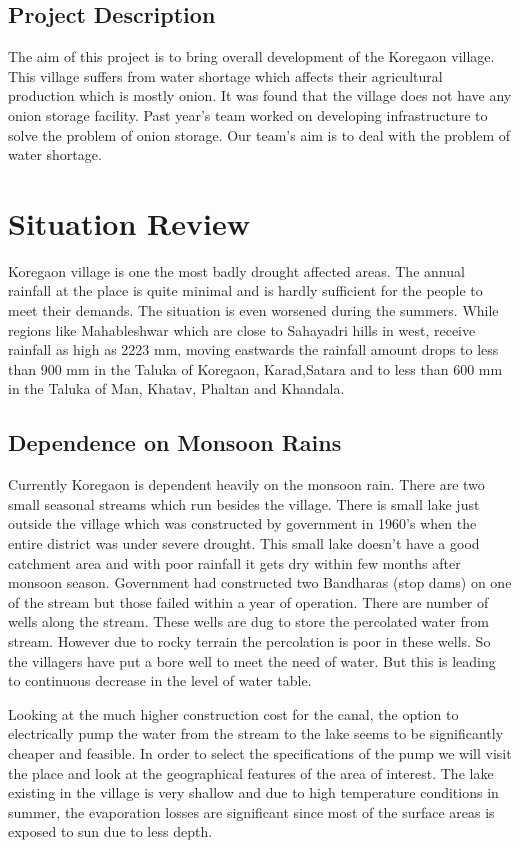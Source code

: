 \documentclass{article}
\begin{document}
\subsection{Project Description}
The aim of this project is to bring overall development of the Koregaon village. This village suffers from
water shortage which affects their agricultural production which is mostly onion. It was found that the
village does not have any onion storage facility. Past year's team worked on developing infrastructure to solve the problem of onion storage. Our team's aim is to deal with the problem of water shortage.
\section{Situation Review}
Koregaon village is one the most badly drought affected areas. The annual rainfall at the place is quite minimal and is hardly sufficient for the people to meet their demands. The situation is even worsened during the summers. While regions like Mahableshwar which are close to Sahayadri hills in west, receive rainfall as high as 2223 mm, moving eastwards the rainfall amount drops to less than 900 mm in the Taluka of Koregaon, Karad,Satara and to less than 600 mm in the Taluka of Man, Khatav, Phaltan and Khandala.
\subsection{Dependence on Monsoon Rains}
Currently Koregaon is dependent heavily on the monsoon rain. There are two small seasonal streams which run besides the village. There is small lake just outside the village which was constructed by government in 1960’s when the entire district was under severe drought. This small lake doesn’t have a good catchment area and with poor rainfall it gets dry within few months after monsoon season. Government had constructed two Bandharas (stop dams) on one of the stream but those failed within a year of operation. There are number of wells along the stream. These wells are dug to store the percolated water from stream. However due to rocky terrain the percolation is poor in these wells. So the villagers have put a bore well to meet the need of water. But this is leading to continuous decrease in the level of water table.

Looking at the much higher construction cost for the canal, the option to electrically pump the water from the stream to the lake seems to be significantly cheaper and feasible. In order to select the specifications of the pump we will visit the place and look at the geographical features of the area of interest. The lake existing in the village is very shallow and due to high temperature conditions in summer, the evaporation losses are significant since most of the surface areas is exposed to sun due to less depth.
\end{document}

